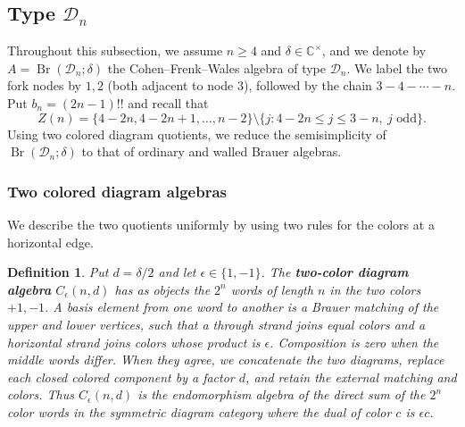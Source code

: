 \documentclass[11pt,a4paper]{amsart}
\theoremstyle{uprightdefinition}
\newtheorem{definition}[theorem]{Definition}
\theoremstyle{remark}\newtheorem{remark}[theorem]{Remark}
\begin{document}
\subsection{Type \texorpdfstring{$\mathscr{D}_n$}{Dn}}
\label{subsec:type-D}
\label{app:typeD}
\label{sec:D-reduction}

Throughout this subsection, we assume $n\geq4$ and $\delta\in\mathbb C^\times$, and we denote by
$A=\operatorname{Br}(\mathscr{D}_n;\delta)$ the Cohen--Frenk--Wales algebra of type $\mathscr{D}_n$.
We label the two fork nodes by $1,2$ (both adjacent to node $3$), followed by the chain
$3-4-\cdots-n$. Put $b_n=(2n-1)!!$ and recall that
\[
 Z(n)=\{4-2n,4-2n+1,\ldots,n-2\}
 \setminus\{j:4-2n\leq j\leq3-n,\ j\text{ odd}\}.
\]
Using two colored diagram quotients, we reduce the semisimplicity of
$\operatorname{Br}(\mathscr{D}_n;\delta)$ to that of ordinary and walled Brauer algebras.

\subsubsection{Two colored diagram algebras}

We describe the two quotients uniformly by using two rules for
the colors at a horizontal edge.

\begin{definition}\label{def:colored-algebras}
Put $d=\delta/2$ and let $\epsilon\in\{1,-1\}$.
The \textbf{two-color diagram algebra} $C_\epsilon(n,d)$ has as
objects the $2^n$ words of length
$n$ in the two colors $+1,-1$. A basis element from one word to another
is a Brauer matching of the upper and lower vertices, such that a through
strand joins equal colors and a horizontal strand joins colors whose
product is $\epsilon$. Composition is zero when the middle words differ.
When they agree, we concatenate the two diagrams, replace each closed colored component by a
factor $d$, and retain the external matching and colors. Thus $C_\epsilon(n,d)$
is the endomorphism algebra of the direct sum of the $2^n$ color words in the symmetric
diagram category where the dual of color $c$ is $\epsilon c$.
\end{definition}
\end{document}
